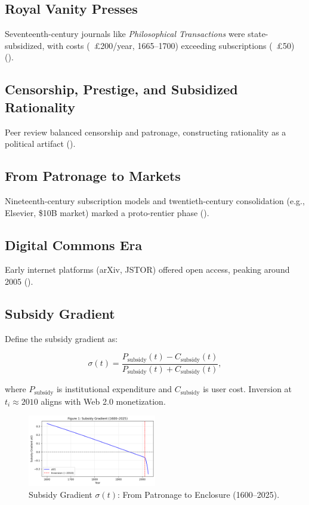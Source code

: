 \documentclass[12pt]{article}
\begin{document}
\subsection{Royal Vanity Presses}

Seventeenth-century journals like \textit{Philosophical Transactions} were state-subsidized, with costs (~£200/year, 1665–1700) exceeding subscriptions (~£50) (\citealp{Johns1998,Biagioli2002}).

\subsection{Censorship, Prestige, and Subsidized Rationality}

Peer review balanced censorship and patronage, constructing rationality as a political artifact (\citealp{Biagioli2002}).

\subsection{From Patronage to Markets}

Nineteenth-century subscription models and twentieth-century consolidation (e.g., Elsevier, \$10B market) marked a proto-rentier phase (\citealp{Fyfe2016,Csiszar2018}).

\subsection{Digital Commons Era}

Early internet platforms (arXiv, JSTOR) offered open access, peaking around 2005 (\citealp{Csiszar2018}).

\subsection{Subsidy Gradient}

Define the subsidy gradient as:

\[
\sigma(t) = \frac{P_{\text{subsidy}}(t) - C_{\text{subsidy}}(t)}{P_{\text{subsidy}}(t) + C_{\text{subsidy}}(t)},
\]

where \(P_{\text{subsidy}}\) is institutional expenditure and \(C_{\text{subsidy}}\) is user cost. Inversion at \(t_i \approx 2010\) aligns with Web 2.0 monetization.

\begin{figure}[h]
\centering
\includegraphics[width=0.5\textwidth]{subsidy_gradient.png}
\caption{Subsidy Gradient \(\sigma(t)\): From Patronage to Enclosure (1600–2025).}
\label{fig:subsidy}
\end{figure}
\end{document}
